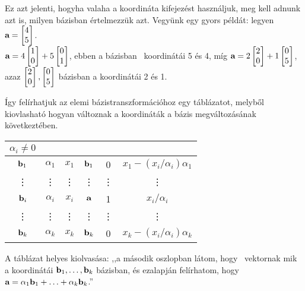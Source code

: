 \documentclass[a4paper,11.5pt]{article}
\begin{document}
	Ez azt jelenti, hogyha valaha a koordináta kifejezést használjuk, meg kell adnunk azt is, milyen bázisban értelmezzük azt. Vegyünk egy gyors példát: legyen $\a=
		\begin{bmatrix}
			4\s\\
			5\s
		\end{bmatrix}$.\\
		$\a=4
		\begin{bmatrix}
			1\s\\
			0\s
		\end{bmatrix}+5
		\begin{bmatrix}
			0\s\\
			1\s
		\end{bmatrix}$, ebben a bázisban \a\ koordinátái 5 és 4, míg
	$\a=2
	\begin{bmatrix}
		2\s\\
		0\s
	\end{bmatrix}+1
	\begin{bmatrix}
		0\s\\
		5\s
	\end{bmatrix}$,
	   azaz
	$\begin{bmatrix}
		2\s\\
		0\s
	\end{bmatrix},
	\begin{bmatrix}
		0\s\\
		5\s
	\end{bmatrix}$
	   bázisban a koordinátái 2 és 1.
	
	Így felírhatjuk az elemi bázistranszformációhoz egy táblázatot, melyből kiovlasható hogyan változnak a koordináták a bázis megváltozásának következtében.
	
	\begin{center}
		\begin{tabular}{c|cc||c|cc}
			$\alpha_i\not=0$&\a&\x&&\a&\x\\
			\hline
			$\textbf{b}_1$&$\alpha_1$&$x_1$&$\textbf{b}_1$&0&$x_1-(x_i/\alpha_i)\alpha_1$\\
			\vdots&\vdots&\vdots&\vdots&\vdots&\vdots\\
			$\textbf{b}_i$&$\alpha_i$&$x_i$&$\textbf{a}$&1&$x_i/\alpha_i$\\
			\vdots&\vdots&\vdots&\vdots&\vdots&\vdots\\
			$\textbf{b}_k$&$\alpha_k$&$x_k$&$\textbf{b}_k$&0&$x_k-(x_i/\alpha_i)\alpha_k$\\
		\end{tabular}
	\end{center}
	
	   A táblázat helyes kiolvasása: ,,a második oszlopban látom, hogy \a\  vektornak mik a koordinátái $\textbf{b}_1,\ldots,\textbf{b}_k$ bázisban, és ezalapján felírhatom, hogy $\textbf{a} = \alpha_1\textbf{b}_1+\ldots+\alpha_k\textbf{b}_k$.''
	
\end{document}
